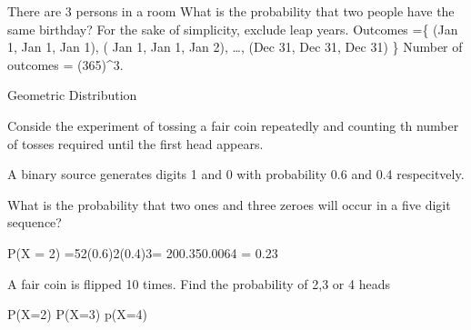  
There are 3 persons in a room
What is the probability that two people have the same birthday?
For the sake of simplicity, exclude leap years.
Outcomes =\{ (Jan 1, Jan 1, Jan 1), ( Jan 1, Jan 1, Jan 2), \ldots , (Dec 31, Dec 31, Dec 31) \}
Number of outcomes = (365)^3.
 
Geometric Distribution
 
Conside the experiment of tossing a fair coin repeatedly and counting th number of tosses required until the first head appears.
 
 
A binary source generates digits 1 and 0 with probability  0.6 and 0.4 respecitvely.
 
What is the probability that two ones and three zeroes will occur in a five digit sequence?
 
 
P(X = 2) =52(0.6)2(0.4)3= 200.350.0064 = 0.23
 
 
A fair coin is flipped 10 times. Find the probability of 2,3 or 4 heads
 
P(X=2)
P(X=3)
p(X=4)
 
